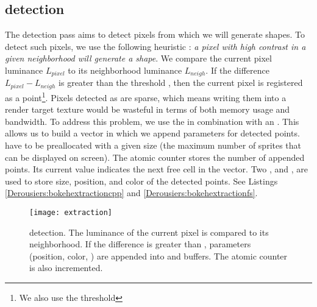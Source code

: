 \subsection{\Bokeh detection}
The detection pass aims to detect pixels from which we will generate \bokeh shapes. To detect such pixels, we use the following heuristic : \emph{a pixel with high contrast in a given neighborhood will generate a \bokeh shape}. We compare the current pixel luminance $L_{pixel}$ to its neighborhood luminance $L_{neigh}$. If the difference $L_{pixel}-L_{neigh}$ is greater than the threshold , then the current pixel is registered as a \bokeh point\footnote{We also use the threshold }. Pixels detected as \bokeh are sparse, which means writing them into a render target texture would be wasteful in terms of both memory usage and bandwidth. To address this problem, we use the \opengl {} in combination with an . This allows us to build a vector in which we append parameters for detected \bokeh points.  have to be preallocated with a given size (\ie the maximum number of \bokeh sprites that can be displayed on screen). The atomic counter  stores the number of appended \bokeh points. Its current value indicates the next free cell in the  vector. Two ,  and , are used to store \coc size, position, and color of the detected \bokeh points. See Listings \ref{Derousiers:bokehextractioncpp} and \ref{Derousiers:bokehextractionfs}.

	\begin{figure}[htb]\centering
	\texttt{[image: extraction]}
	\caption{\Bokeh detection. The luminance of the current pixel is compared to its neighborhood. If the difference is greater than , \bokeh parameters (position, color, \coc) are appended into  and  buffers. The atomic counter  is also incremented.}
	\label{Derousiers:detection}
	\end{figure}

